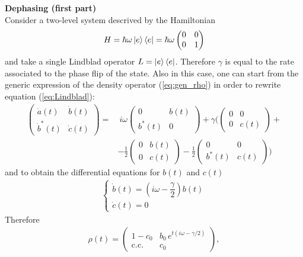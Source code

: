 \begin{tcolorbox} 
\textbf{Dephasing (first part)} \\ 
Consider a two-level system descrived by the Hamiltonian 
\begin{align*}
    H = \hbar \omega \ket{e}\bra{e} = \hbar \omega \begin{pmatrix} 0 & 0 \\ 0 & 1 \end{pmatrix} 
\end{align*}
and take a single Lindblad operator $L = \ket{e}\bra{e}$. Therefore $\gamma$ is equal to the rate associated to the phase flip of the state. Also in this case, one can start from the generic expression of the density operator (\ref{eq:gen_rho}) in order to rewrite equation (\ref{eq:Lindblad}):
\begin{align*}
    \begin{pmatrix} \dot{a}(t) & \dot{b}(t) \\ \dot{b}^*(t) & \dot{c}(t) \end{pmatrix} =&~ i \omega \begin{pmatrix} 0 & b(t) \\ b^*(t) & 0 \end{pmatrix} + \gamma \Bigg( \begin{pmatrix} 0 & 0 \\ 0 & c(t) \end{pmatrix} + \\
    & - \frac{1}{2} \begin{pmatrix} 0 & b(t) \\ 0 & c(t) \end{pmatrix} - \frac{1}{2} \begin{pmatrix} 0 & 0 \\ b^*(t) & c(t) \end{pmatrix} \Bigg)
\end{align*}
and to obtain the differential equations for $b(t)$ and $c(t)$
\begin{align*}
    \begin{cases}
    \dot{b}(t) = \displaystyle \left( i \omega - \dfrac{\gamma}{2}\right) b(t) \\
    \dot{c}(t) = 0 
    \end{cases}
\end{align*}
Therefore
\begin{align*}
    \rho(t) = \begin{pmatrix} 1-c_0 & b_0 \, e^{t(i\omega - \gamma/2)} \\ \text{c.c.} & c_0 \end{pmatrix},

\end{align*}
\end{tcolorbox}
